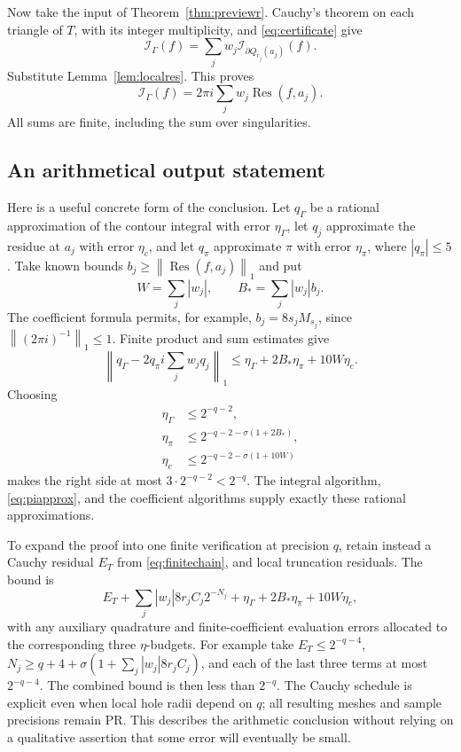 \documentclass[11pt]{article}
\theoremstyle{definition}
\newcommand{\norm}[1]{\left\lVert#1\right\rVert_1}
\newcommand{\Res}{\operatorname{Res}}
\newcommand{\Int}{\mathcal I}
\newcommand{\bd}{\partial}
\begin{document}
Now take the input of Theorem~\ref{thm:previewr}. Cauchy's theorem on
each triangle of \(T\), with its integer multiplicity, and
\eqref{eq:certificate} give
\[
 \Int_\Gamma(f)=\sum_jw_j\Int_{\bd Q_{r_j}(a_j)}(f).
\]
Substitute Lemma~\ref{lem:localres}. This proves
\begin{equation}\label{eq:globalres}
 \boxed{\quad
 \Int_\Gamma(f)=2\pi i\sum_jw_j\Res(f,a_j).
 \quad}
\end{equation}
All sums are finite, including the sum over singularities.

\subsection{An arithmetical output statement}

Here is a useful concrete form of the conclusion. Let \(q_\Gamma\) be a
rational approximation of the contour integral with error
\(\eta_\Gamma\), let \(q_j\) approximate the residue at \(a_j\) with
error \(\eta_c\), and let \(q_\pi\) approximate \(\pi\) with error
\(\eta_\pi\), where \(|q_\pi|\le5\). Take known bounds
\(b_j\ge\norm{\Res(f,a_j)}\) and put
\[
 W=\sum_j|w_j|,\qquad B_*=\sum_j|w_j|b_j.
\]
The coefficient formula permits, for example,
\(b_j=8s_jM_{s_j}\), since \(\norm{(2\pi i)^{-1}}\le1\).
Finite product and sum estimates give
\begin{equation}\label{eq:outputerror}
 \norm{q_\Gamma-2q_\pi i\sum_jw_jq_j}
 \le\eta_\Gamma+2B_*\eta_\pi+10W\eta_c.
\end{equation}
Choosing
\begin{align*}
 \eta_\Gamma&\le2^{-q-2},\\
 \eta_\pi&\le2^{-q-2-\sigma(1+2B_*)},\\
 \eta_c&\le2^{-q-2-\sigma(1+10W)}
\end{align*}
makes the right side at most \(3\cdot2^{-q-2}<2^{-q}\).
The integral algorithm, \eqref{eq:piapprox}, and the coefficient
algorithms supply exactly these rational approximations.

To expand the proof into one finite verification at precision \(q\),
retain instead a Cauchy residual \(E_T\) from
\eqref{eq:finitechain}, and local truncation residuals. The bound is
\begin{equation}\label{eq:expandedbudget}
 E_T+\sum_j|w_j|8r_jC_j2^{-N_j}
       +\eta_\Gamma+2B_*\eta_\pi+10W\eta_c,
\end{equation}
with any auxiliary quadrature and finite-coefficient evaluation errors
allocated to the corresponding three \(\eta\)-budgets.
For example take \(E_T\le2^{-q-4}\),
\(N_j\ge q+4+\sigma(1+\sum_j|w_j|8r_jC_j)\), and each of the last
three terms at most \(2^{-q-4}\). The combined bound is then less than
\(2^{-q}\). The Cauchy schedule is explicit even when local hole radii
depend on \(q\); all resulting meshes and sample precisions remain PR.
This describes the arithmetic conclusion without relying on a
qualitative assertion that some error will eventually be small.
\end{document}
